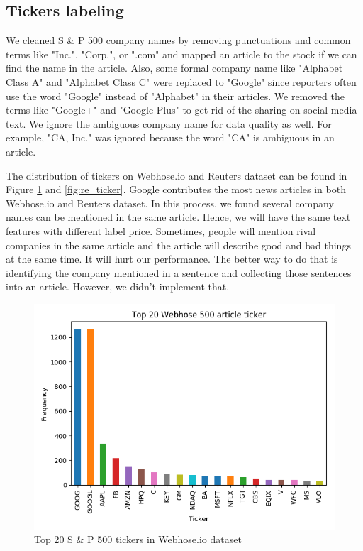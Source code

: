 \documentclass[sigconf]{acmart}
\begin{document}
\subsection{Tickers labeling} \label{ticker_labeling}
We cleaned S \& P 500 company names by removing punctuations and common terms like "Inc.", "Corp.", or ".com" and mapped an article to the stock if we can find the name in the article. Also, some formal
company name like "Alphabet Class A" and "Alphabet Class C" were replaced to "Google" since reporters often use the word "Google" instead of "Alphabet" in their articles. We removed the terms like "Google+"
and "Google Plus" to get rid of the sharing on social media text. We ignore the ambiguous company name for data quality as well. For example, "CA, Inc." was ignored because the word "CA" is ambiguous in an article.

The distribution of tickers on Webhose.io and Reuters dataset can be found in Figure \ref{fig:web_ticker} and \ref{fig:re_ticker}. Google contributes the most news articles in both Webhose.io and Reuters dataset.
In this process, we found several company names can be mentioned in the same article. Hence, we will have the same text features with different label price. Sometimes, people will mention rival companies in the
same article \cite{stanford} and the article will describe good and bad things at the same time. It will hurt our performance. The better way to do that is identifying the company mentioned in a sentence and
collecting those sentences into an article. However, we didn't implement that.


\begin{figure}
  \includegraphics[width=\linewidth]{../../picture/webhose_500_ticker.png}
  \caption{Top 20 S \& P 500 tickers in Webhose.io dataset}
  \label{fig:web_ticker}
\end{figure}
\end{document}
